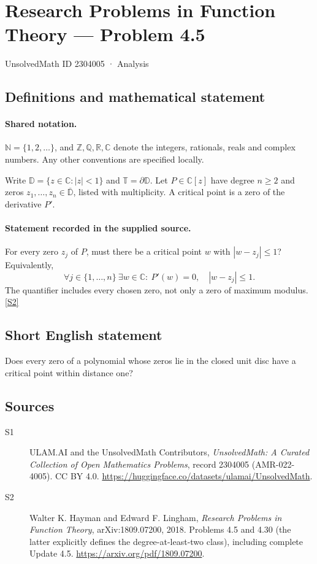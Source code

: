 \documentclass[11pt]{book}
\newcommand{\sref}[2]{\hyperlink{source:#1:#2}{[S#2]}}
\begin{document}
\setcounter{section}{2304004}
\section{Research Problems in Function Theory — Problem 4.5}\label{2304005}
{\small\sffamily UnsolvedMath ID 2304005 · Analysis}
\subsection{Definitions and mathematical statement}

\paragraph{Shared notation.}$\mathbb N=\{1,2,\ldots\}$, and $\mathbb Z,\mathbb Q,\mathbb R,\mathbb C$ denote the integers, rationals, reals and complex numbers. Any other conventions are specified locally.


Write $\mathbb D=\{z\in\mathbb C:|z|<1\}$ and $\mathbb T=\partial\mathbb D$. Let $P\in\mathbb C[z]$ have degree $n\ge2$ and zeros $z_1,\ldots,z_n\in\overline{\mathbb D}$, listed with multiplicity. A critical point is a zero of the derivative $P'$.
\paragraph{Statement recorded in the supplied source.}
For every zero $z_j$ of $P$, must there be a critical point $w$ with $|w-z_j|\le1$? Equivalently,
\[\forall j\in\{1,\ldots,n\}\ \exists w\in\mathbb C:\ P'(w)=0,\quad|w-z_j|\le1.
\]
The quantifier includes every chosen zero, not only a zero of maximum modulus. \sref{2304005}{2}
\subsection{Short English statement}
Does every zero of a polynomial whose zeros lie in the closed unit disc have a critical point within distance one?
\subsection{Sources}
\begin{description}
\item[\hypertarget{source:2304005:1}{S1}] ULAM.AI and the UnsolvedMath Contributors, \emph{UnsolvedMath: A Curated Collection of Open Mathematics Problems}, record 2304005 (AMR-022-4005). CC BY 4.0. \url{https://huggingface.co/datasets/ulamai/UnsolvedMath}.
\item[\hypertarget{source:2304005:2}{S2}] Walter K. Hayman and Edward F. Lingham, \emph{Research Problems in Function Theory}, arXiv:1809.07200, 2018. Problems 4.5 and 4.30 (the latter explicitly defines the degree-at-least-two class), including complete Update 4.5. \url{https://arxiv.org/pdf/1809.07200}.
\end{description}
\label{end:2304005}
\end{document}
